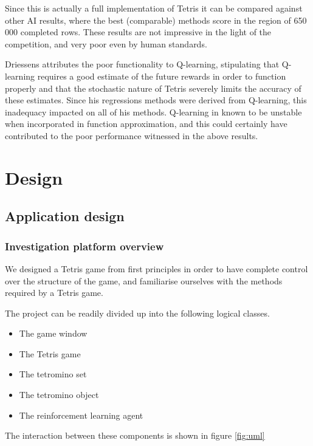 \documentclass{rucsthesis}
\begin{document}
Since this is actually a full implementation of Tetris it can be compared against other AI results, where the best (comparable) methods score in the region of 650 000 completed rows\citep{tetstand}. These results are not impressive in the light of the competition, and very poor even by human standards. 

Driessens attributes the poor functionality to Q-learning, stipulating that Q-learning requires a good estimate of the future rewards in order to function properly and that the stochastic nature of Tetris severely limits the accuracy of these estimates. Since his regressions methods were derived from Q-learning, this inadequacy impacted on all of his methods. Q-learning in known to be unstable\citep[pg. 4]{keepaway,thrun93issues} when incorporated in function approximation, and this could certainly have contributed to the poor performance witnessed in the above results.

\chapter{Design}

\section{Application design}

\subsection{Investigation platform overview}

We designed a Tetris game from first principles in order to have complete control over the structure of the game, and familiarise ourselves with the methods required by a Tetris game.

The project can be readily divided up into the following logical classes.

\begin{itemize}
\item{The game window}
\item{The Tetris game}
\item{The tetromino set}
\item{The tetromino object}
\item{The reinforcement learning agent}
\end{itemize}

The interaction between these components is shown in figure \ref{fig:uml}
\end{document}
